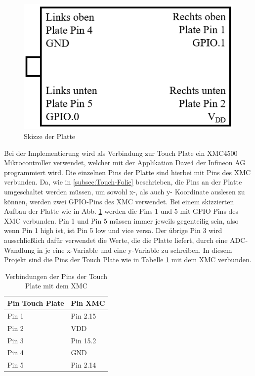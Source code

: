 \documentclass[12pt,a4paper,bibliography=totoc,listof=totoc]{scrartcl}
\begin{document}
\begin{figure}[htbp]
	\centering
	\includegraphics[scale = 0.6]{pics/PlatteSkizze.png}
	\caption{Skizze der Platte} 
	\label{fig:PlatteSkizze}
\end{figure}

Bei der Implementierung wird als Verbindung zur Touch Plate ein XMC4500 Mikrocontroller verwendet, welcher mit der Applikation Dave4 der Infineon AG programmiert wird.
Die einzelnen Pins der Platte sind hierbei mit Pins des XMC verbunden. Da, wie in \ref{subsec:Touch-Folie} beschrieben, die Pins an der Platte umgeschaltet werden müssen, um sowohl x-, als auch y- Koordinate auslesen zu können, werden zwei GPIO-Pins des XMC verwendet. Bei einem skizzierten Aufbau der Platte wie in Abb. \ref{fig:PlatteSkizze} werden die Pins 1 und 5 mit GPIO-Pins des XMC verbunden. Pin 1 und Pin 5 müssen immer jeweils gegenteilig sein, also wenn Pin 1 high ist, ist Pin 5 low und vice versa.
Der übrige Pin 3 wird ausschließlich dafür verwendet die Werte, die die Platte liefert, durch eine ADC-Wandlung in je eine x-Variable und eine y-Variable zu schreiben. 
In diesem Projekt sind die Pins der Touch Plate wie in Tabelle \ref{tab:VerbindungenPins} mit dem XMC verbunden.

\begin{table}[]
\centering
\begin{tabular}{l|l}
Pin Touch Plate & Pin XMC \\
\hline
Pin 1           & Pin 2.15\\
Pin 2           & VDD     \\
Pin 3           & Pin 15.2    \\
Pin 4           & GND     \\
Pin 5           & Pin 2.14
\end{tabular}
\caption{Verbindungen der Pins der Touch Plate mit dem XMC \label{tab:VerbindungenPins}}
\end{table}
\end{document}
